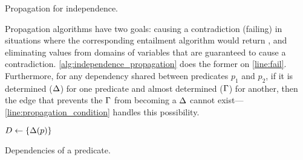 \begin{algorithm}[t]
  \LinesNumbered
  \caption{Propagation for independence.}\label{alg:independence_propagation}
\end{algorithm}

Propagation algorithms have two goals: causing a contradiction (failing) in
situations where the corresponding entailment algorithm would return \false{},
and eliminating values from domains of variables that are guaranteed to cause a
contradiction. \cref{alg:independence_propagation} does the former on
\cref{line:fail}. Furthermore, for any dependency shared between predicates
$p_1$ and $p_2$, if it is determined ($\operatorname{\Delta}$) for one predicate and
almost determined ($\operatorname{\Gamma}$) for another, then the edge that prevents
the $\operatorname{\Gamma}$ from becoming a $\operatorname{\Delta}$ cannot
exist---\cref{line:propagation_condition} handles this possibility.

\begin{algorithm}[t]
   {
    $D \gets \{ \operatorname{\Delta}(p) \}$\;
  }
  \caption{Dependencies of a predicate.}\label{alg:dependencies}
\end{algorithm}

